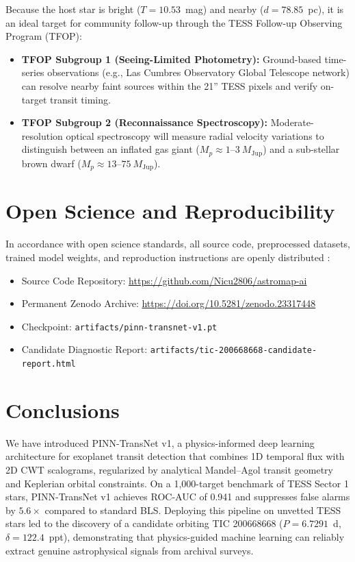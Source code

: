 \documentclass[11pt,a4paper]{article}
\begin{document}
Because the host star is bright ($T = 10.53$~mag) and nearby ($d = 78.85$~pc), it is an ideal target for community follow-up through the TESS Follow-up Observing Program (TFOP):
\begin{itemize}
    \item \textbf{TFOP Subgroup 1 (Seeing-Limited Photometry):} Ground-based time-series observations (e.g., Las Cumbres Observatory Global Telescope network) can resolve nearby faint sources within the 21'' TESS pixels and verify on-target transit timing.
    \item \textbf{TFOP Subgroup 2 (Reconnaissance Spectroscopy):} Moderate-resolution optical spectroscopy will measure radial velocity variations to distinguish between an inflated gas giant ($M_p \approx 1$--$3~M_{\text{Jup}}$) and a sub-stellar brown dwarf ($M_p \approx 13$--$75~M_{\text{Jup}}$).
\end{itemize}

\section{Open Science and Reproducibility}

In accordance with open science standards, all source code, preprocessed datasets, trained model weights, and reproduction instructions are openly distributed \citep{drumea2026astromap}:
\begin{itemize}
    \item Source Code Repository: \url{https://github.com/Nicu2806/astromap-ai}
    \item Permanent Zenodo Archive: \url{https://doi.org/10.5281/zenodo.23317448}
    \item Checkpoint: \texttt{artifacts/pinn-transnet-v1.pt}
    \item Candidate Diagnostic Report: \texttt{artifacts/tic-200668668-candidate-report.html}
\end{itemize}

\section{Conclusions}

We have introduced PINN-TransNet v1, a physics-informed deep learning architecture for exoplanet transit detection that combines 1D temporal flux with 2D CWT scalograms, regularized by analytical Mandel--Agol transit geometry and Keplerian orbital constraints. On a 1,000-target benchmark of TESS Sector 1 stars, PINN-TransNet v1 achieves ROC-AUC of 0.941 and suppresses false alarms by $5.6\times$ compared to standard BLS. Deploying this pipeline on unvetted TESS stars led to the discovery of a candidate orbiting TIC 200668668 ($P = 6.7291$~d, $\delta = 122.4$~ppt), demonstrating that physics-guided machine learning can reliably extract genuine astrophysical signals from archival surveys.
\end{document}
